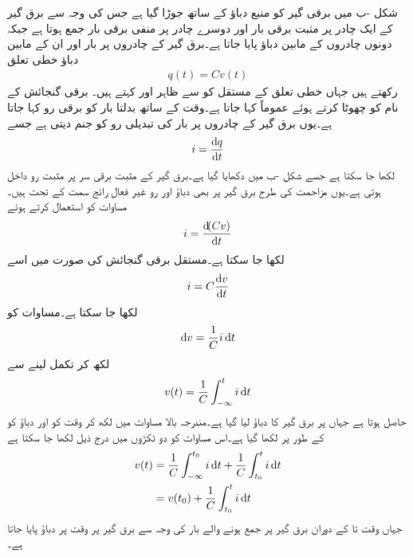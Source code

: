 شکل -ب میں برقی گیر کو  منبع دباؤ کے ساتھ جوڑا گیا ہے  جس کی وجہ سے برق گیر کے ایک چادر پر مثبت برقی بار  اور دوسرے چادر پر منفی برقی بار  جمع ہوتا ہے جبکہ دونوں چادروں کے مابین دباؤ  پایا جاتا ہے۔برق گیر کے چادروں پر بار اور ان کے مابین دباؤ خطی تعلق
\begin{align}\label{مساوات_امالہ_بار_دباو_تعلق}
q(t)=C v(t)
\end{align}
رکھتے ہیں جہاں خطی تعلق کے مستقل کو  سے ظاہر اور   کہتے ہیں۔ برقی گنجائش کے نام کو چھوٹا کرتے ہوئے عموماً  کہا جاتا ہے۔وقت کے ساتھ بدلتا بار کو برقی رو کہا جاتا ہے۔یوں برق گیر کے چادروں پر بار کی تبدیلی رو کو جنم دیتی ہے جسے
\begin{align}
i=\frac{\dif q}{\dif t}
\end{align}
لکھا جا سکتا ہے جسے شکل -ب میں دکھایا گیا ہے۔برق گیر کے مثبت برقی سر پر مثبت رو داخل ہوتی ہے۔یوں مزاحمت کی طرح  برق گیر پر بھی دباؤ اور رو غیر فعال رائج سمت کے تحت ہیں۔ مساوات  کو استعمال کرتے ہوئے 
\begin{align}
i=\frac{\dif (C v)}{\dif t}
\end{align}
لکھا جا سکتا ہے۔مستقل برقی گنجائش کی صورت میں اسے
\begin{align}\label{مساوات_امالہ_بار_دباو_تعلق_ب}
i=C\frac{\dif v}{\dif t}
\end{align}
لکھا جا سکتا ہے۔مساوات  کو
\begin{align*}
\dif v = \frac{1}{C} i \dif t
\end{align*}
لکھ کر تکمل لینے سے
\begin{align}\label{مساوات_امالہ_بار_دباو_تعلق_پ}
v(t)=\frac{1}{C} \int_{-\infty}^{t} i \dif t
\end{align}
حاصل ہوتا ہے جہاں  پر برق گیر کا دباؤ  لیا گیا ہے۔مندرجہ بالا مساوات میں  لکھ کر وقت کو  اور دباؤ کو  کے طور پر لکھا گیا ہے۔اس مساوات کو دو ٹکڑوں میں درج ذیل لکھا جا سکتا ہے
\begin{gather}
\begin{aligned}\label{مساوات_امالہ_ابتدائی_دباو_الف}
v(t)&=\frac{1}{C} \int_{-\infty}^{t_0} i \dif t+\frac{1}{C} \int_{t_0}^{t} i \dif t\\
&=v(t_0)+\frac{1}{C} \int_{t_0}^{t} i \dif t
\end{aligned}
\end{gather}
جہاں وقت  تا  کے دوران برق گیر پر جمع ہونے والے بار کی وجہ سے  برق گیر پر وقت  پر دباؤ  پایا جاتا ہے۔ 

